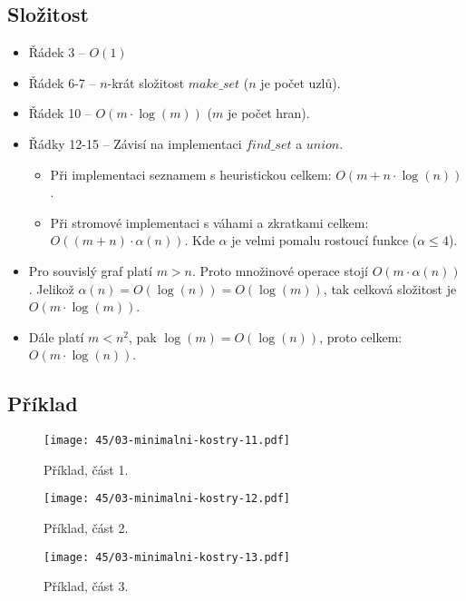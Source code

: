 \subsection{Složitost}

\begin{itemize}
    \item Řádek 3 -- $O(1)$
    \item Řádek 6-7 -- $n$-krát složitost $make\_set$ ($n$ je počet uzlů).
    \item Řádek 10 -- $O(m \cdot \log(m))$ ($m$ je počet hran).
    \item Řádky 12-15 -- Závisí na implementaci $find\_set$ a $union$.
    \begin{itemize}
        \item Při implementaci seznamem s heuristickou celkem: $O(m + n \cdot \log(n))$.
        \item Při stromové implementaci s váhami a zkratkami celkem: $O((m+n) \cdot \alpha(n))$. Kde $\alpha$ je velmi pomalu rostoucí funkce ($\alpha \leq 4$).
    \end{itemize}
    \item Pro souvislý graf platí $m > n$. Proto množinové operace stojí $O(m \cdot \alpha(n))$. Jelikož $\alpha(n) = O(\log(n)) = O(\log(m))$, tak celková složitost je $O(m \cdot \log(m))$.
    \item Dále platí $m < n^2$, pak $\log(m) = O(\log(n))$, proto celkem: $O(m \cdot \log(n))$.
\end{itemize}

\subsection{Příklad}

\begin{figure}[H]
    \centering
    \texttt{[image: 45/03-minimalni-kostry-11.pdf]}
    \caption{Příklad, část 1.}
\end{figure}

\begin{figure}[H]
    \centering
    \texttt{[image: 45/03-minimalni-kostry-12.pdf]}
    \caption{Příklad, část 2.}
\end{figure}

\begin{figure}[H]
    \centering
    \texttt{[image: 45/03-minimalni-kostry-13.pdf]}
    \caption{Příklad, část 3.}
\end{figure}

